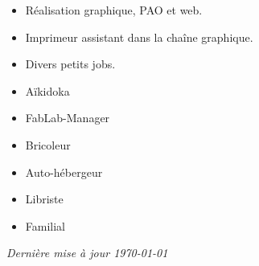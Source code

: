 \documentclass[10pt,a4paper,ragged2e,withhyper,normalphoto]{altacv}
\begin{document}
\begin{paracol}{2}
\divider

\begin{itemize}
\item Réalisation graphique, PAO et web.
\end{itemize}

\divider

\begin{itemize}
\item Imprimeur assistant dans la chaîne graphique.
\end{itemize}

\divider

\begin{itemize}
\item Divers petits jobs.
\end{itemize}

\end{paracol}


\begin{paracol}{2}

\begin{itemize}
\item Aïkidoka
\item FabLab-Manager
\item Bricoleur
\switchcolumn
\item Auto-hébergeur
\item Libriste
\item Familial
\end{itemize}

\end{paracol}

\bigskip

\raggedleft
{\textit{Dernière mise à jour \today}}
\end{document}

